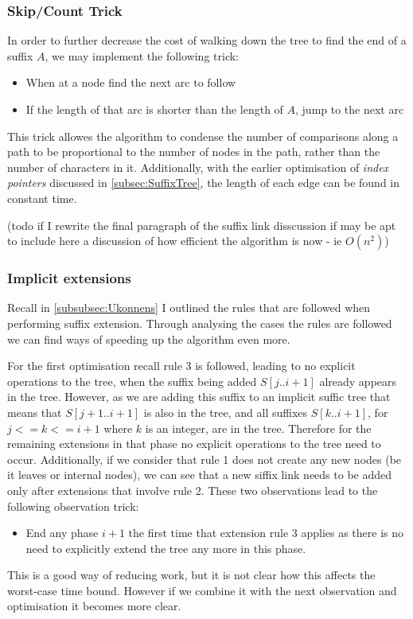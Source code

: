 \documentclass[12pt,twoside,notitlepage]{report}
\begin{document}
					\subsubsection{Skip/Count Trick}
					In order to further decrease the cost of walking down the tree to find the end of a suffix $A$, we may implement the following trick:
					\begin{itemize}
						\item{When at a node find the next arc to follow}
						\item{If the length of that arc is shorter than the length of $A$, jump to the next arc}
					\end{itemize}
					
					This trick allowes the algorithm to condense the number of comparisons along a path to be proportional to the number of nodes in the path, rather than the number of characters in it. Additionally, with the earlier optimisation of \emph{index pointers} discussed in \ref{subsec:SuffixTree}, the length of each edge can be found in constant time.
					
					(todo if I rewrite the final paragraph of the suffix link disscussion if may be apt to include here a discussion of how efficient the algorithm is now - ie $O(n^2)$)
					
					\subsubsection{Implicit extensions}
					Recall in \ref{subsubsec:Ukonnens} I outlined the rules that are followed when performing suffix extension. Through analysing the cases the rules are followed we can find ways of speeding up the algorithm even more.
					
					
					For the first optimisation recall rule 3 is followed, leading to no explicit operations to the tree, when the suffix being added $S[j..i+1]$ already appears in the tree. However, as we are adding this suffix to an implicit suffic tree that means that $S[j+1..i+1]$ is also in the tree, and all suffixes $S[k..i+1]$, for $j<=k<=i+1$ where $k$ is an integer, are in the tree. Therefore for the remaining extensions in that phase no explicit operations to the tree need to occur. Additionally, if we consider that rule 1 does not create any new nodes (be it leaves or internal nodes), we can see that a new siffix link needs to be added only after extensions that involve rule 2. These two observations lead to the following observation trick:
					\begin{itemize}
						\item{End any phase $i+1$ the first time that extension rule 3 applies as there is no need to explicitly extend the tree any more in this phase.}
					\end{itemize}
					This is a good way of reducing work, but it is not clear how this affects the worst-case time bound. However if we combine it with the next observation and optimisation it becomes more clear.
					
\end{document}
